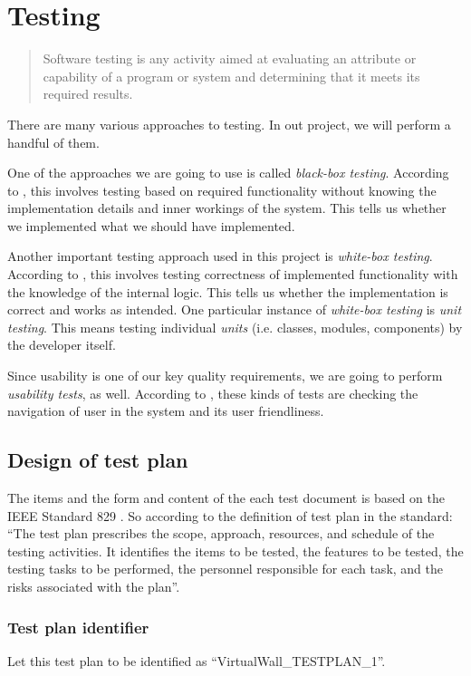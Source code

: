 \documentclass[11pt]{book}
\begin{document}
\chapter{Testing}

\begin{quotation}\noindent
Software testing is any activity aimed at evaluating an attribute or capability of a program or system and determining that it meets its required results. \cite{pan}
\end{quotation}

There are many various approaches to testing. In out project, we will perform a handful of them.

One of the approaches we are going to use is called \emph{black-box testing}. According to \cite{shinde}, this involves testing based on required functionality without knowing the implementation details and inner workings of the system. This tells us whether we implemented what we should have implemented.

Another important testing approach used in this project is \emph{white-box testing}. According to \cite{shinde}, this involves testing correctness of implemented functionality with the knowledge of the internal logic. This tells us whether the implementation is correct and works as intended. One particular instance of \emph{white-box testing} is \emph{unit testing}. This means testing individual \emph{units} (i.e. classes, modules, components) by the developer itself.

Since usability is one of our key quality requirements, we are going to perform \emph{usability tests}, as well. According to \cite{shinde}, these kinds of tests are checking the navigation of user in the system and its user friendliness.

\section{Design of test plan}

The items and the form and content of the each test document is based on the IEEE Standard 829 \cite{ieee829}. So according to the definition of test plan in the standard: ``The test plan prescribes the scope, approach, resources, and schedule of the testing activities. It identifies the items to be tested, the features to be tested, the testing tasks to be performed, the personnel responsible for each task, and the risks associated with the plan''.

\subsection{Test plan identifier}
Let this test plan to be identified as ``VirtualWall\_TESTPLAN\_1''.
\end{document}
